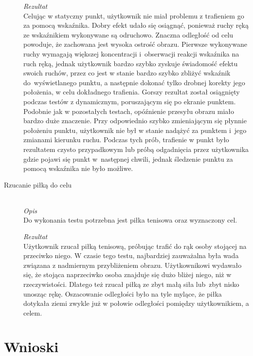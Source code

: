\documentclass[a4paper,11pt,twoside]{report}
\theoremstyle{definition}
\begin{document}
\begin{description}
\textit{Rezultat} \\
Celując w statyczny punkt, użytkownik nie miał problemu z trafieniem go za pomocą wskaźnika. Dobry efekt udało się osiągnąć, ponieważ ruchy ręką ze wskaźnikiem wykonywane są odruchowo. Znaczna odległość od celu powoduje, że zachowana jest wysoka ostrość obrazu. Pierwsze wykonywane ruchy wymagają większej koncentracji i~obserwacji reakcji wskaźnika na ruch ręką, jednak użytkownik bardzo szybko zyskuje świadomość efektu swoich ruchów, przez co jest w stanie bardzo szybko zbliżyć wskaźnik do~wyświetlanego punktu, a następnie dokonać tylko drobnej korekty jego położenia, w celu dokładnego trafienia. Gorszy rezultat został osiągnięty podczas testów z dynamicznym, poruszającym się po ekranie punktem. Podobnie jak w pozostałych testach, opóźnienie przesyłu obrazu miało bardzo duże znaczenie. Przy odpowiednio szybko zmieniającym się płynnie położeniu punktu, użytkownik nie był w stanie nadążyć za punktem i~jego zmianami kierunku ruchu. Podczas tych prób, trafienie w punkt było rezultatem czysto przypadkowym lub próbą odgadnięcia przez użytkownika gdzie pojawi się punkt w~następnej chwili, jednak śledzenie punktu za pomocą wskaźnika nie było możliwe.

\item[Rzucanie piłką do celu] \hfill \\
\textit{Opis} \\
Do wykonania testu potrzebna jest piłka tenisowa oraz wyznaczony cel. 

\textit{Rezultat} \\
Użytkownik rzucał piłką tenisową, próbując trafić do rąk osoby stojącej na przeciwko niego. W czasie tego testu, najbardziej zauważalna była wada związana z nadmiernym przybliżeniem obrazu. Użytkownikowi wydawało się, że stojąca naprzeciwko osoba znajduje się dużo bliżej niego, niż w rzeczywistości. Dlatego też rzucał piłką ze zbyt małą siła lub~zbyt nisko unosząc rękę. Oszacowanie odległości było na tyle mylące, że piłka dotykała ziemi zwykle już w połowie odległości pomiędzy użytkownikiem, a celem.

\end{description}

\section{Wnioski}
\end{document}

